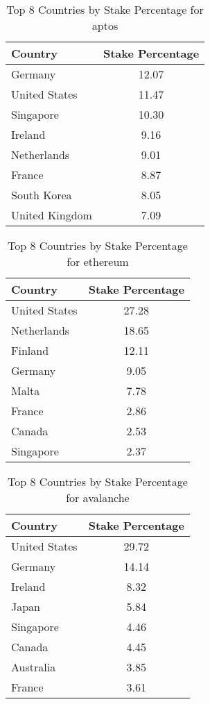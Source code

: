 \documentclass{article}
\begin{document}
\begin{table}[htbp]
    \centering
    \caption{Top 8 Countries by Stake Percentage for aptos}
    \begin{tabular}{|l|c|}
    \hline
    Country & Stake Percentage \\
    \hline
    Germany & 12.07 \\
United States & 11.47 \\
Singapore & 10.30 \\
Ireland & 9.16 \\
Netherlands & 9.01 \\
France & 8.87 \\
South Korea & 8.05 \\
United Kingdom & 7.09 \\
\hline
\end{tabular}
\end{table}

\begin{table}[htbp]
    \centering
    \caption{Top 8 Countries by Stake Percentage for ethereum}
    \begin{tabular}{|l|c|}
    \hline
    Country & Stake Percentage \\
    \hline
    United States & 27.28 \\
Netherlands & 18.65 \\
Finland & 12.11 \\
Germany & 9.05 \\
Malta & 7.78 \\
France & 2.86 \\
Canada & 2.53 \\
Singapore & 2.37 \\
\hline
\end{tabular}
\end{table}

\begin{table}[htbp]
    \centering
    \caption{Top 8 Countries by Stake Percentage for avalanche}
    \begin{tabular}{|l|c|}
    \hline
    Country & Stake Percentage \\
    \hline
    United States & 29.72 \\
Germany & 14.14 \\
Ireland & 8.32 \\
Japan & 5.84 \\
Singapore & 4.46 \\
Canada & 4.45 \\
Australia & 3.85 \\
France & 3.61 \\
\hline
\end{tabular}
\end{table}
\end{document}
